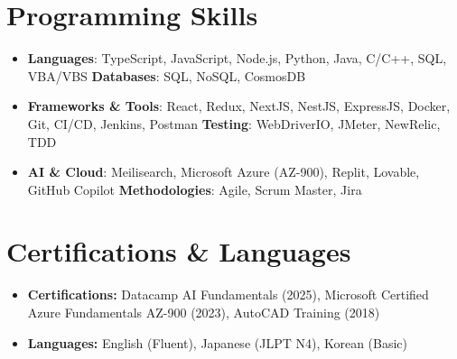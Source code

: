\documentclass[letterpaper,11pt]{article}
\newcommand{\resumeSubHeadingListStart}{\begin{itemize}[leftmargin=*]}
\newcommand{\resumeSubHeadingListEnd}{\end{itemize}}
\begin{document}
\section{Programming Skills}
 \resumeSubHeadingListStart
   \item{
     \textbf{Languages}{: TypeScript, JavaScript, Node.js, Python, Java, C/C++, SQL, VBA/VBS}
     \hfill
     \textbf{Databases}{: SQL, NoSQL, CosmosDB}
   }
   \item{
     \textbf{Frameworks \& Tools}{: React, Redux, NextJS, NestJS, ExpressJS, Docker, Git, CI/CD, Jenkins, Postman}
     \hfill
     \textbf{Testing}{: WebDriverIO, JMeter, NewRelic, TDD}
   }
   \item{
     \textbf{AI \& Cloud}{: Meilisearch, Microsoft Azure (AZ-900), Replit, Lovable, GitHub Copilot}
     \hfill
     \textbf{Methodologies}{: Agile, Scrum Master, Jira}
   }
 \resumeSubHeadingListEnd

\section{Certifications \& Languages}
  \resumeSubHeadingListStart
    \item{
      \textbf{Certifications: } Datacamp AI Fundamentals (2025), Microsoft Certified Azure Fundamentals AZ-900 (2023), AutoCAD Training (2018)
    }
    \item{
      \textbf{Languages: } English (Fluent), Japanese (JLPT N4), Korean (Basic)
    }
  \resumeSubHeadingListEnd
\end{document}
